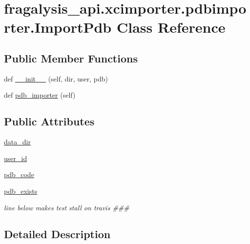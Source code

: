 \hypertarget{classfragalysis__api_1_1xcimporter_1_1pdbimporter_1_1_import_pdb}{}\section{fragalysis\+\_\+api.\+xcimporter.\+pdbimporter.\+Import\+Pdb Class Reference}
\label{classfragalysis__api_1_1xcimporter_1_1pdbimporter_1_1_import_pdb}
\subsection*{Public Member Functions}
\begin{DoxyCompactItemize}
\item 
def \hyperlink{classfragalysis__api_1_1xcimporter_1_1pdbimporter_1_1_import_pdb_adce98d493e0b72a1c383d26a4a84590f}{\+\_\+\+\_\+init\+\_\+\+\_\+} (self, dir, user, pdb)
\item 
def \hyperlink{classfragalysis__api_1_1xcimporter_1_1pdbimporter_1_1_import_pdb_acd432818f58309c5a65c92db9ca08ada}{pdb\+\_\+importer} (self)
\end{DoxyCompactItemize}
\subsection*{Public Attributes}
\begin{DoxyCompactItemize}
\item 
\hyperlink{classfragalysis__api_1_1xcimporter_1_1pdbimporter_1_1_import_pdb_a682ae0196455b3ba21d1f6f8083324ea}{data\+\_\+dir}
\item 
\hyperlink{classfragalysis__api_1_1xcimporter_1_1pdbimporter_1_1_import_pdb_a4e8f2945727ef48feba2a568eab43b3b}{user\+\_\+id}
\item 
\hyperlink{classfragalysis__api_1_1xcimporter_1_1pdbimporter_1_1_import_pdb_ab65dffc1f5b788b8d47cebf3a27ea08c}{pdb\+\_\+code}
\item 
\hyperlink{classfragalysis__api_1_1xcimporter_1_1pdbimporter_1_1_import_pdb_a32f7fbde8f3a111497280a932de510e6}{pdb\+\_\+exists}
\begin{DoxyCompactList}\small\item\em line below makes test stall on travis \#\#\# \end{DoxyCompactList}\end{DoxyCompactItemize}


\subsection{Detailed Description}


